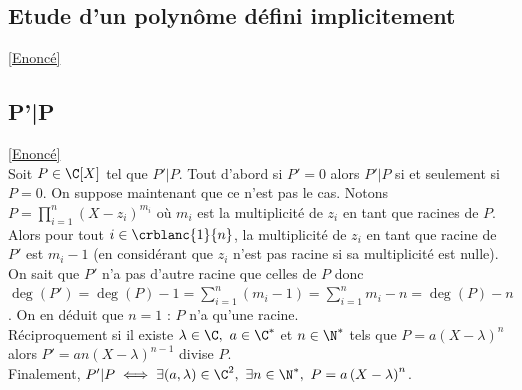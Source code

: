 \documentclass{book}
\begin{document}
	\subsection{Etude d'un polynôme défini implicitement}\label{sec:etude-dun-polynome-defini-implicitement}
	\textcolor{blue}{\hyperref[etudepolyimplicite]{[Enoncé]}}\\
	
	\subsection{P'|P }
	\label{sec:P'|P}
	\textcolor{blue}{\hyperref[P'|P]{[Enoncé]}}\\
	Soit $P\in \C[X]$ tel que $P'|P$. Tout d'abord si $P'=0$ alors $P'|P$ si et seulement si $P=0$. On suppose maintenant que ce n'est pas le cas. Notons $P=\displaystyle\prod\limits_{i=1}^n\left(X-z_i\right)^{m_i}$ où $m_i$ est la multiplicité de $z_i$ en tant que racines de $P$. Alors pour tout $i\in \crblanc{1}{n}$, la multiplicité de $z_i$ en tant que racine de $P'$ est $m_i-1$ (en considérant que $z_i$ n'est pas racine si sa multiplicité est nulle).\\
	On sait que $P'$ n'a pas d'autre racine que celles de $P$ donc $\deg(P')=\deg(P)-1=\displaystyle\sum\limits_{i=1}^n(m_i-1)=\sum\limits_{i=1}^nm_i-n=\deg(P)-n$. On en déduit que $n=1$ : $P$ n'a qu'une racine.\\
	Réciproquement si il existe $\lambda\in \C,\ a\in \C^*$ et $n\in \N^*$ tels que $P=a\left(X-\lambda\right)^n$ alors $P'=an\left(X-\lambda\right)^{n-1}$ divise $P$.\\
	Finalement, $P'|P\iff \exists (a,\lambda)\in \C^2,\ \exists n\in \N^*,\ P=a\left(X-\lambda\right)^n$.
	
\end{document}
